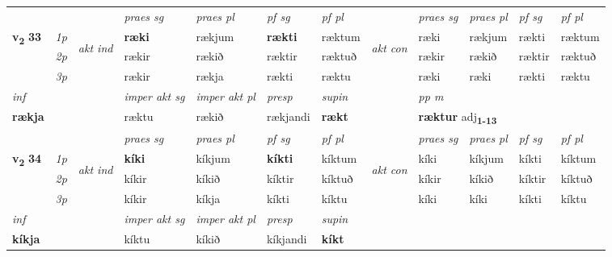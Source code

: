 \begin{longtable}[l]{X>{\footnotesize\itshape}llXXXXlXXXX}
\midrule

 & &   & \textit{praes sg}  & \textit{praes pl}    & \textit{ pf sg} & \textit{pf pl} & & \textit{praes sg}  & \textit{praes pl}    & \textit{pf sg} & \textit{pf pl }  \\ \cmidrule{4-7} \cmidrule{9-12}
 \multirow{2}{*}{{{\textbf{v{\textsubscript{2}}} \Large{\textbf{33}}}}}  & 1p & \multirow{3}{*}{\begin{turn}{90}\textit{akt ind}\end{turn}} & \textbf{ræki} & rækjum & \textbf{rækti} & ræktum & \multirow{3}{*}{\begin{turn}{90}\textit{akt con}\end{turn}} &ræki & rækjum & rækti & ræktum\\*
 & 2p &  &  rækir  & rækið & ræktir & ræktuð & & rækir & rækið & ræktir & ræktuð \\*
 & 3p &  & rækir & rækja & rækti & ræktu & & ræki & ræki& rækti & ræktu \\*
\cmidrule{4-7} \cmidrule{9-12}

   {\textit{inf}} & &  & \textit{imper akt sg} & \textit{imper akt pl}   & \textit{presp} & \textit{supin}  && \textit{pp m} \\*
  {\textbf{rækja}} & && ræktu  & rækið   & rækjandi &  \textbf{rækt}  && \multicolumn{2}{l}{\textbf{ræktur} adj\textbf{\textsubscript{1-13}}} \\*

\midrule

 & &   & \textit{praes sg}  & \textit{praes pl}    & \textit{ pf sg} & \textit{pf pl} & & \textit{praes sg}  & \textit{praes pl}    & \textit{pf sg} & \textit{pf pl }  \\ \cmidrule{4-7} \cmidrule{9-12}
 \multirow{2}{*}{{{\textbf{v{\textsubscript{2}}} \Large{\textbf{34}}}}}  & 1p & \multirow{3}{*}{\begin{turn}{90}\textit{akt ind}\end{turn}} & \textbf{kíki} & kíkjum & \textbf{kíkti} & kíktum & \multirow{3}{*}{\begin{turn}{90}\textit{akt con}\end{turn}} &kíki & kíkjum & kíkti & kíktum\\*
 & 2p &  &  kíkir  & kíkið & kíktir & kíktuð & & kíkir & kíkið & kíktir & kíktuð \\*
 & 3p &  & kíkir & kíkja & kíkti & kíktu & & kíki & kíki& kíkti & kíktu \\*
\cmidrule{4-7} \cmidrule{9-12}

   {\textit{inf}} & &  & \textit{imper akt sg} & \textit{imper akt pl}   & \textit{presp} & \textit{supin}   \\*
  {\textbf{kíkja}} & && kíktu  & kíkið   & kíkjandi &  \textbf{kíkt}   \\*


\end{longtable}
